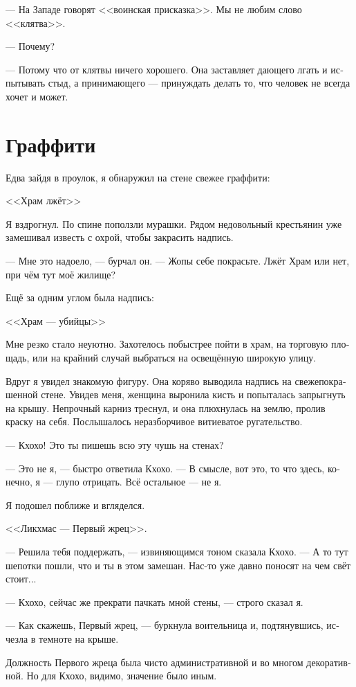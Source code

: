 \documentclass[a4paper,12pt,fleqn]{book}\usepackage{cooltooltips}\usepackage{polyglossia}\setdefaultlanguage[babelshorthands=true]{russian}\setotherlanguage{english}\defaultfontfeatures{Ligatures=TeX,Mapping=tex-text} \usepackage{xcolor}\definecolor{lightgray}{HTML}{bbbbbb}\color{lightgray}\newcommand{\ml}[3]{\textenglish{\textcolor{black}{#3}}}
\begin{document}
{--- На Западе говорят <<воинская присказка>>.
Мы не любим слово <<клятва>>.

--- Почему?

--- Потому что от клятвы ничего хорошего.
Она заставляет дающего лгать и испытывать стыд, а принимающего --- принуждать делать то, что человек не всегда хочет и может.

\section{Граффити}

Едва зайдя в проулок, я обнаружил на стене свежее граффити:

<<Храм лжёт>>

Я вздрогнул.
По спине поползли мурашки.
Рядом недовольный крестьянин уже замешивал известь с охрой, чтобы закрасить надпись.

--- Мне это надоело, --- бурчал он.
--- Жопы себе покрасьте.
Лжёт Храм или нет, при чём тут моё жилище?

Ещё за одним углом была надпись:

<<Храм --- убийцы>>

Мне резко стало неуютно.
Захотелось побыстрее пойти в храм, на торговую площадь, или на крайний случай выбраться на освещённую широкую улицу.

Вдруг я увидел знакомую фигуру.
Она коряво выводила надпись на свежепокрашенной стене.
Увидев меня, женщина выронила кисть и попыталась запрыгнуть на крышу.
Непрочный карниз треснул, и она плюхнулась на землю, пролив краску на себя.
Послышалось неразборчивое витиеватое ругательство.

--- Кхохо!
Это ты пишешь всю эту чушь на стенах?

--- Это не я, --- быстро ответила Кхохо.
--- В смысле, вот это, то что здесь, конечно, я --- глупо отрицать.
Всё остальное --- не я.

Я подошел поближе и вгляделся.

<<Ликхмас --- Первый жрец>>.

--- Решила тебя поддержать, --- извиняющимся тоном сказала Кхохо.
--- А то тут шепотки пошли, что и ты в этом замешан.
Нас-то уже давно поносят на чем свёт стоит...

--- Кхохо, сейчас же прекрати пачкать мной стены, --- строго сказал я.

--- Как скажешь, Первый жрец, --- буркнула воительница и, подтянувшись, исчезла в темноте на крыше.

Должность Первого жреца была чисто административной и во многом декоративной.
Но для Кхохо, видимо, значение было иным.

}
\end{document}
